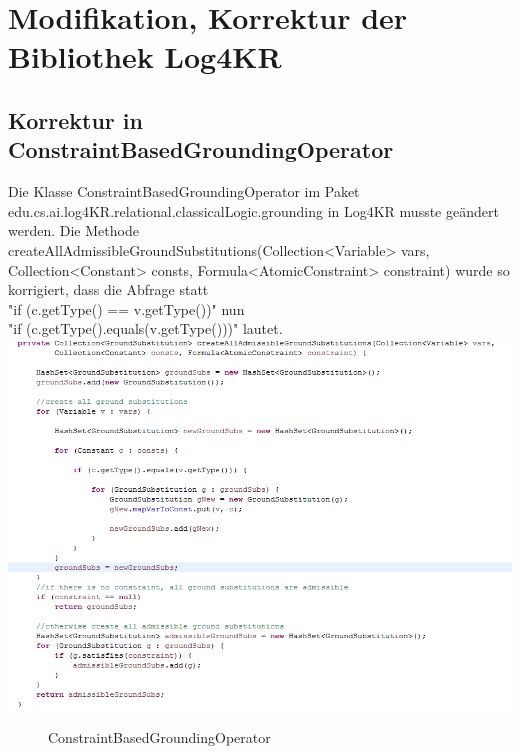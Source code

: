 \documentclass[a4paper, 11pt]{book}
\begin{document}
\chapter{Modifikation, Korrektur der Bibliothek Log4KR}
\section{Korrektur in ConstraintBasedGroundingOperator}
\label{sec:Korrektur1}
Die Klasse ConstraintBasedGroundingOperator im Paket edu.cs.ai.log4KR.relational.classicalLogic.grounding in Log4KR musste geändert werden. Die Methode createAllAdmissibleGroundSubstitutions(Collection<Variable> vars,
Collection<Constant> consts, Formula<AtomicConstraint> constraint) wurde so korrigiert, dass die Abfrage statt\\
 "{}if (c.getType() == v.getType())"{} 
nun \\
"{}if (c.getType().equals(v.getType()))"{} lautet.\\
\includegraphics[scale = 1.0]{Graphics/Aenderung_1}
\begin{figure}[h]
	\caption{ConstraintBasedGroundingOperator}
\end{figure}
\end{document}
